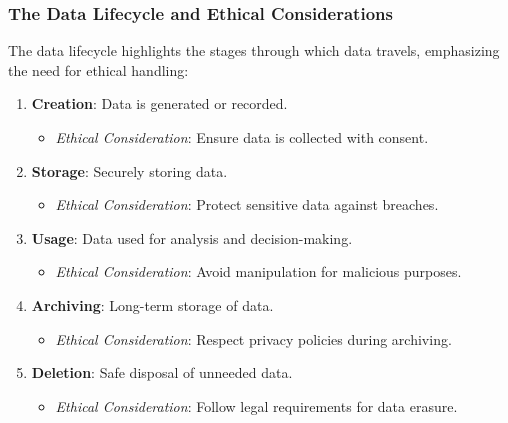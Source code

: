 \documentclass[aspectratio=169]{beamer}
\begin{document}
\begin{frame}[fragile]
    \frametitle{The Data Lifecycle and Ethical Considerations}
    The data lifecycle highlights the stages through which data travels, emphasizing the need for ethical handling:

    \begin{enumerate}
        \item \textbf{Creation}: Data is generated or recorded.
        \begin{itemize}
            \item \textit{Ethical Consideration}: Ensure data is collected with consent.
        \end{itemize}

        \item \textbf{Storage}: Securely storing data.
        \begin{itemize}
            \item \textit{Ethical Consideration}: Protect sensitive data against breaches.
        \end{itemize}

        \item \textbf{Usage}: Data used for analysis and decision-making.
        \begin{itemize}
            \item \textit{Ethical Consideration}: Avoid manipulation for malicious purposes.
        \end{itemize}

        \item \textbf{Archiving}: Long-term storage of data.
        \begin{itemize}
            \item \textit{Ethical Consideration}: Respect privacy policies during archiving.
        \end{itemize}

        \item \textbf{Deletion}: Safe disposal of unneeded data.
        \begin{itemize}
            \item \textit{Ethical Consideration}: Follow legal requirements for data erasure.
        \end{itemize}
    \end{enumerate}
\end{frame}
\end{document}
